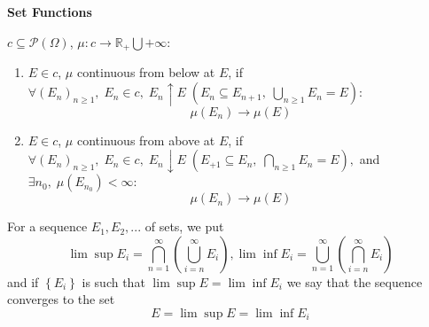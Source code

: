 \setcounter{lecture}{3}

\begin{center}
	\Large \bf Set Functions
\end{center}

\vspace{0.25cm}

\begin{definition}
	$ c \subseteq \mathcal{P}\left(\Omega\right) $, $ \mu:  c \to \mathbb{R}_{+} \bigcup {+ \infty} $:
	\begin{enumerate}
		\item \label{def3.1.1} $ E \in c $, $ \mu $ continuous from below at $ E $, if $\forall {\left( {{E_n}} \right)_{n \geqslant 1}},\;{E_n} \in c,\;{E_n} \uparrow E\;\left( {{E_n} \subseteq {E_{n + 1}},\;\bigcup\limits_{n \geqslant 1} {{E_n} = E} } \right):$
		\begin{equation}
		\mu \left( {{E_n}} \right) \to \mu \left( E \right)
		\label{eq3.1}
		\end{equation}
		\item \label{def3.1.2}  $ E \in c $, $ \mu $ continuous from above at $ E $, if $\forall {\left( {{E_n}} \right)_{n \geqslant 1}},\;{E_n} \in c,\;{E_n} \downarrow E\;\left( {{E_{+1}} \subseteq {E_{n}},\;\bigcap\limits_{n \geqslant 1} {{E_n} = E} } \right),$ and $\exists {n_0},\;\mu \left( {{E_{{n_0}}}} \right) < \infty $:
		\begin{equation}
		\mu \left( {{E_n}} \right) \to \mu \left( E \right)
		\label{eq3.2}
		\end{equation}
	\end{enumerate}
\label{def3.1}
\end{definition}

\begin{remark}
	For a sequence $ E_{1},E_{2}, ... $ of sets, we put 
	\begin{equation}
	\lim \sup {E_i} = \bigcap\limits_{n = 1}^\infty  {\left( {\bigcup\limits_{i = n}^\infty  {{E_i}} } \right)} ,\lim \inf {E_i} = \bigcup\limits_{n = 1}^\infty  {\left( {\bigcap\limits_{i = n}^\infty  {{E_i}} } \right)} 
	\end{equation}
	and if $\left\{ {{E_i}} \right\}$ is such that ${\lim \sup E = \lim \inf {E_i}}$ we say that the sequence converges to the set 
	\begin{equation}
	{E = \lim \sup E = \lim \inf {E_i}}
	\end{equation}
	\label{rmk3.1}
\end{remark}

